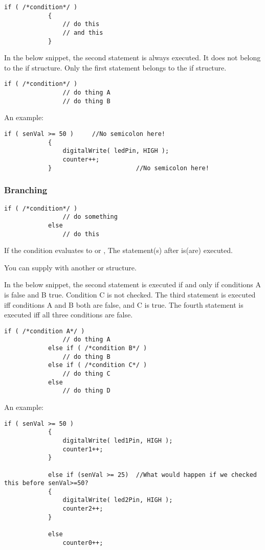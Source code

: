 \documentclass{article}
\begin{document}
			\begin{lstlisting}[gobble=12]
			if ( /*condition*/ )
			{
				// do this
				// and this
			}
			\end{lstlisting}

			In the below snippet, the second statement is always executed. It does not belong to the if structure. Only the first statement belongs to the if structure.

			\begin{lstlisting}[gobble=12]
			if ( /*condition*/ )
				// do thing A
				// do thing B
			\end{lstlisting}

			An example:

			\begin{lstlisting}[gobble=12]
			if ( senVal >= 50 )		//No semicolon here!
			{
				digitalWrite( ledPin, HIGH );
				counter++;
			}						//No semicolon here!
			\end{lstlisting}

		\subsubsection{Branching}

			\begin{lstlisting}[gobble=12]
			if ( /*condition*/ )
				// do something
			else 
				// do this
			\end{lstlisting}

			If the condition evaluates to  or , The statement(s) after  is(are) executed.

			You can supply  with another  or  structure. 

			In the below snippet, the second statement is executed if and only if conditions A is false and B true. Condition C is not checked. The third statement is executed iff conditions A and B both are false, and C is true. The fourth statement is executed iff all three conditions are false.

			\begin{lstlisting}[gobble=12]
			if ( /*condition A*/ )
				// do thing A
			else if ( /*condition B*/ )
				// do thing B
			else if ( /*condition C*/ )
				// do thing C
			else
				// do thing D
			\end{lstlisting}

			An example:

			\begin{lstlisting}[gobble=12]
			if ( senVal >= 50 )
			{
				digitalWrite( led1Pin, HIGH );
				counter1++;
			}

			else if (senVal >= 25)	//What would happen if we checked this before senVal>=50?
			{
				digitalWrite( led2Pin, HIGH );
				counter2++;
			}

			else 
				counter0++;

			\end{lstlisting}
\end{document}
